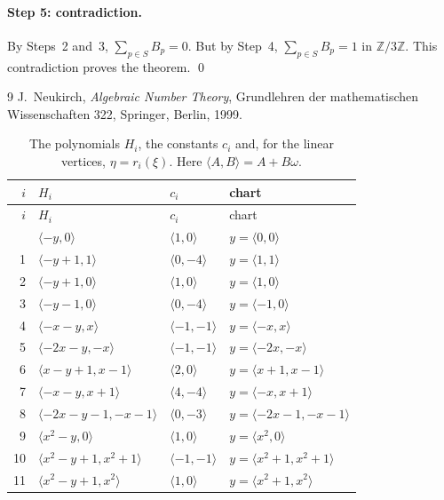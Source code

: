 \documentclass[11pt]{article}
\newcommand{\Z}{\mathbb{Z}}
\begin{document}
\paragraph{Step 5: contradiction.} By Steps~2 and~3, $\sum_{p\in S}B_p=0$. But by Step~4, $\sum_{p\in S}B_p=1$ in $\Z/3\Z$. This contradiction proves the theorem.
\qed


\begin{thebibliography}{9}
 J.~Neukirch, \emph{Algebraic Number Theory}, Grundlehren der mathematischen Wissenschaften 322, Springer, Berlin, 1999.
\end{thebibliography}

\clearpage
\begingroup\small
\setlength{\LTcapwidth}{\textwidth}
\begin{longtable}{@{}rlll@{}}
\caption{The polynomials $H_i$, the constants $c_i$ and, for the linear vertices, $\eta=r_i(\xi)$. Here $\langle A,B\rangle=A+B\omega$.}\label{tab:vert1}\\
\hline $i$ & $H_i$ & $c_i$ & chart\\\hline\endfirsthead\hline $i$ & $H_i$ & $c_i$ & chart\\\hline\endhead\hline\endfoot
0 & $\langle -y,0\rangle$ & $\langle 1,0\rangle$ & $y=\langle 0,0\rangle$\\
1 & $\langle -y+1,1\rangle$ & $\langle 0,-4\rangle$ & $y=\langle 1,1\rangle$\\
2 & $\langle -y+1,0\rangle$ & $\langle 1,0\rangle$ & $y=\langle 1,0\rangle$\\
3 & $\langle -y-1,0\rangle$ & $\langle 0,-4\rangle$ & $y=\langle -1,0\rangle$\\
4 & $\langle -x-y,x\rangle$ & $\langle -1,-1\rangle$ & $y=\langle -x,x\rangle$\\
5 & $\langle -2x-y,-x\rangle$ & $\langle -1,-1\rangle$ & $y=\langle -2x,-x\rangle$\\
6 & $\langle x-y+1,x-1\rangle$ & $\langle 2,0\rangle$ & $y=\langle x+1,x-1\rangle$\\
7 & $\langle -x-y,x+1\rangle$ & $\langle 4,-4\rangle$ & $y=\langle -x,x+1\rangle$\\
8 & $\langle -2x-y-1,-x-1\rangle$ & $\langle 0,-3\rangle$ & $y=\langle -2x-1,-x-1\rangle$\\
9 & $\langle x^{2}-y,0\rangle$ & $\langle 1,0\rangle$ & $y=\langle x^{2},0\rangle$\\
10 & $\langle x^{2}-y+1,x^{2}+1\rangle$ & $\langle -1,-1\rangle$ & $y=\langle x^{2}+1,x^{2}+1\rangle$\\
11 & $\langle x^{2}-y+1,x^{2}\rangle$ & $\langle 1,0\rangle$ & $y=\langle x^{2}+1,x^{2}\rangle$\\

\end{longtable}
\end{document}
